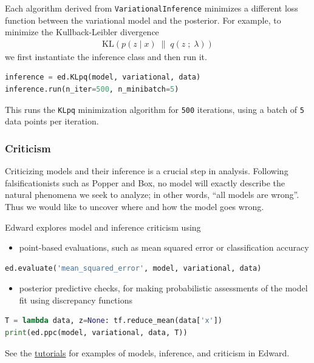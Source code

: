 Each algorithm derived from \texttt{VariationalInference} minimizes a
different loss function between the variational model and the
posterior.
For example, to minimize the Kullback-Leibler divergence
\begin{align*}
  \text{KL}(p(z \mid x) \;\|\; q(z \;;\; \lambda))
\end{align*}
we first instantiate the inference class and then run it.
\begin{lstlisting}[language=Python]
inference = ed.KLpq(model, variational, data)
inference.run(n_iter=500, n_minibatch=5)
\end{lstlisting}
This runs the \texttt{KLpq} minimization algorithm for \texttt{500} iterations,
using a batch of \texttt{5} data points per iteration.

\subsubsection{Criticism}\label{criticism}

Criticizing models and their inference is a crucial step in analysis.
Following falsificationists such as Popper and Box, no model will exactly
describe the natural phenomena we seek to analyze; in other words, ``all models
are wrong''. Thus we would like to uncover where and how the model goes wrong.

Edward explores model and inference criticism using
\begin{itemize}
  \item point-based evaluations, such as mean squared error or
  classification accuracy
\end{itemize}
\begin{lstlisting}[language=Python]
ed.evaluate('mean_squared_error', model, variational, data)
\end{lstlisting}
\begin{itemize}
  \item posterior predictive checks, for making probabilistic
  assessments of the model fit using discrepancy functions
\end{itemize}
\begin{lstlisting}[language=Python]
T = lambda data, z=None: tf.reduce_mean(data['x'])
print(ed.ppc(model, variational, data, T))
\end{lstlisting}

See the \href{tutorials.html}{tutorials} for examples of models,
inference, and criticism in Edward.

